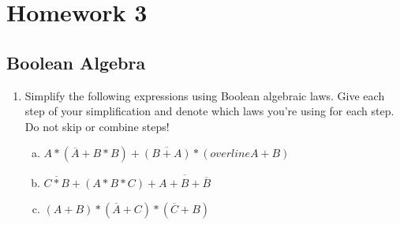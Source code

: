 \documentclass[11pt]{article}
\begin{document}
\section{Homework 3}


\subsection{Boolean Algebra}
\begin{enumerate}
    \item Simplify the following expressions using Boolean algebraic laws. Give each step of your simplification and denote which laws you’re using for each step. Do not skip or combine steps!
    \begin{enumerate}[(a)]
        \item  $A * (\overline{A}+B*B) + \overline{(B+A)} * (overline{A} + B)$
        \item $\overline{C * B} + ( A * B * C) + \overline{A + B + \overline{B}}$
        \item $(A + B) * (\overline{A} + C) * (\overline{C} + B)$
    \end{enumerate}
\end{enumerate}
\end{document}

